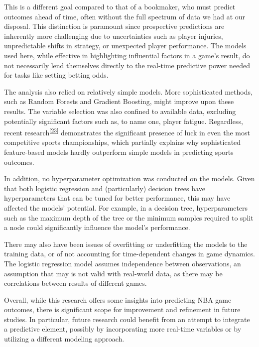 \documentclass[
  12pt,
  a4paper,
]{article}
\begin{document}
This is a different goal compared to that of a bookmaker, who must predict outcomes ahead of time, often without the full spectrum of data we had at our disposal. This distinction is paramount since prospective predictions are inherently more challenging due to uncertainties such as player injuries, unpredictable shifts in strategy, or unexpected player performance. The models used here, while effective in highlighting influential factors in a game's result, do not necessarily lend themselves directly to the real-time predictive power needed for tasks like setting betting odds.

The analysis also relied on relatively simple models. More sophisticated methods, such as Random Forests and Gradient Boosting, might improve upon these results. The variable selection was also confined to available data, excluding potentially significant factors such as, to name one, player fatigue. Regardless, recent research\textsuperscript{{[}\protect\hyperlink{ref-luck}{23}{]}} demonstrates the significant presence of luck in even the most competitive sports championships, which partially explains why sophisticated feature-based models hardly outperform simple models in predicting sports outcomes.

In addition, no hyperparameter optimization was conducted on the models. Given that both logistic regression and (particularly) decision trees have hyperparameters that can be tuned for better performance, this may have affected the models' potential. For example, in a decision tree, hyperparameters such as the maximum depth of the tree or the minimum samples required to split a node could significantly influence the model's performance.

There may also have been issues of overfitting or underfitting the models to the training data, or of not accounting for time-dependent changes in game dynamics. The logistic regression model assumes independence between observations, an assumption that may is not valid with real-world data, as there may be correlations between results of different games.

Overall, while this research offers some insights into predicting NBA game outcomes, there is significant scope for improvement and refinement in future studies. In particular, future research could benefit from an attempt to integrate a predictive element, possibly by incorporating more real-time variables or by utilizing a different modeling approach.

\newpage
\end{document}
